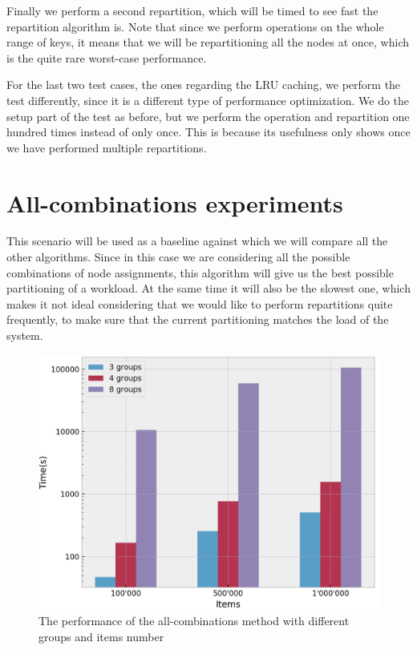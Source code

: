 Finally we perform a second repartition, which will be timed to see fast the repartition algorithm is. Note that since we perform operations on the whole range of keys, it means that we will be repartitioning all the nodes at once, which is the quite rare worst-case performance.

For the last two test cases, the ones regarding the LRU caching, we perform the test differently, since it is a different type of performance optimization. We do the setup part of the test as before, but we perform the operation and repartition one hundred times instead of only once. This is because its usefulness only shows once we have performed multiple repartitions.


\section{All-combinations experiments}\label{sec:All-combinations}
This scenario will be used as a baseline against which we will compare all the other algorithms. Since in this case we are considering all the possible combinations of node assignments, this algorithm will give us the best possible partitioning of a workload. At the same time it will also be the slowest one, which makes it not ideal considering that we would like to perform repartitions quite frequently, to make sure that the current partitioning matches the load of the system.

\begin{figure}[!htb]
  \centering
  \includegraphics[width=\textwidth,height=\textheight,keepaspectratio]{img/all.png}
  \caption{The performance of the all-combinations method with different groups and items number}
  \label{fig:all}
\end{figure}


